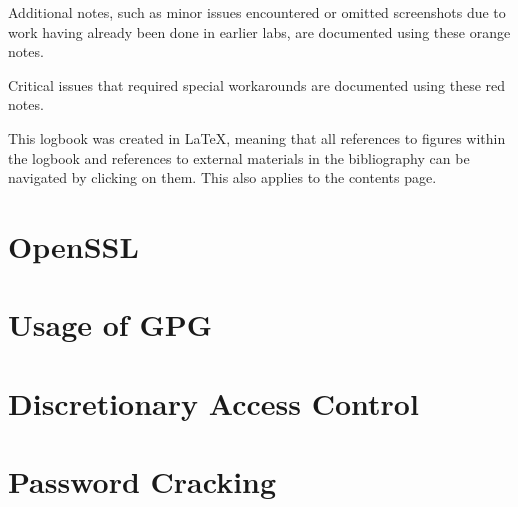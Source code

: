\documentclass[12pt]{report}
\begin{document}
    \vspace{50pt}

    \begin{tcolorbox}[colback=orange!5!white,colframe=orange!75!black,title=Example note]
        Additional notes, such as minor issues encountered or omitted screenshots due to
        work having already been done in earlier labs, are documented using these orange notes.
    \end{tcolorbox}

    \vspace{5pt}

    \begin{tcolorbox}[colback=red!5!white,colframe=red!75!black,title=Example important note]
        Critical issues that required special workarounds are documented using these red notes.
    \end{tcolorbox}

    \vspace{5pt}

    \begin{tcolorbox}[colback=pink!2!white,colframe=pink,title=Logbook navigation]
        This logbook was created in LaTeX, meaning that all references to figures within the
        logbook and references to external materials in the bibliography can be navigated by
        clicking on them.
        This also applies to the contents page.
    \end{tcolorbox}


    \chapter{OpenSSL}\label{ch:lab1}
    

    \newpage

    \chapter{Usage of GPG}\label{ch:lab2}
    

    \addtocounter{chapter}{2} %
    \chapter{Discretionary Access Control}\label{ch:lab5}
    

    \chapter{Password Cracking}\label{ch:lab6}
    
\end{document}
